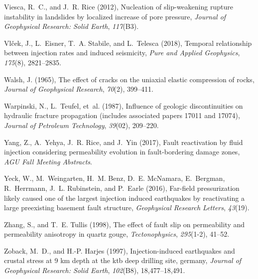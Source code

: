 \documentclass[grl]{agutex2arxiv}
\begin{document}
\begin{article}
\begin{thebibliography}{44}
Viesca, R.~C., and J.~R. Rice (2012), Nucleation of slip-weakening rupture
  instability in landslides by localized increase of pore pressure,
  \textit{Journal of Geophysical Research: Solid Earth}, \textit{117}(B3).

Vl{\v{c}}ek, J., L.~Eisner, T.~A. Stabile, and L.~Telesca (2018), Temporal
  relationship between injection rates and induced seismicity, \textit{Pure and
  Applied Geophysics}, \textit{175}(8), 2821--2835.

Walsh, J. (1965), The effect of cracks on the uniaxial elastic compression of
  rocks, \textit{Journal of Geophysical Research}, \textit{70}(2), 399--411.

Warpinski, N., L.~Teufel, et~al. (1987), Influence of geologic discontinuities
  on hydraulic fracture propagation (includes associated papers 17011 and
  17074), \textit{Journal of Petroleum Technology}, \textit{39}(02), 209--220.

{Yang}, Z., A.~{Yehya}, J.~R. {Rice}, and J.~{Yin} (2017), {Fault reactivation
  by fluid injection considering permeability evolution in fault-bordering
  damage zones}, \textit{AGU Fall Meeting Abstracts}.

Yeck, W., M.~Weingarten, H.~M. Benz, D.~E. McNamara, E.~Bergman, R.~Herrmann,
  J.~L. Rubinstein, and P.~Earle (2016), Far-field pressurization likely caused
  one of the largest injection induced earthquakes by reactivating a large
  preexisting basement fault structure, \textit{Geophysical Research Letters},
  \textit{43}(19).

Zhang, S., and T.~E. Tullis (1998), The effect of fault slip on permeability
  and permeability anisotropy in quartz gouge, \textit{Tectonophysics},
  \textit{295}(1-2), 41--52.

Zoback, M.~D., and H.-P. Harjes (1997), Injection-induced earthquakes and
  crustal stress at 9 km depth at the ktb deep drilling site, germany,
  \textit{Journal of Geophysical Research: Solid Earth}, \textit{102}(B8),
  18,477--18,491.

\end{thebibliography}

\end{article}
\end{document}
